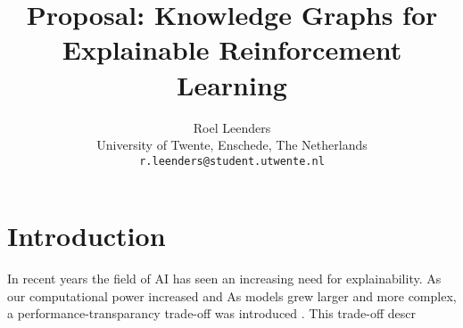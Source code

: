 \documentclass[11pt]{article}
\title{Proposal: Knowledge Graphs for Explainable Reinforcement Learning}
\author{Roel Leenders \\
  University of Twente, Enschede, The Netherlands \\
  \texttt{r.leenders@student.utwente.nl}}
\begin{document}
\maketitle

\section{Introduction}


In recent years the field of AI has seen an increasing need for explainability. As our computational power increased
and 
As models grew larger and more complex, a performance-transparancy trade-off was introduced \cite{}. 
This trade-off descr
\end{document}
